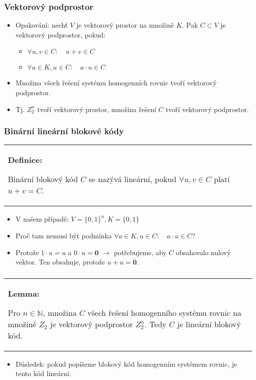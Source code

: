 \documentclass{beamer}
\newenvironment{definice}
{
    \begin{center}
    \begin{tabular}{p{9cm}}
    \textbf{Definice:}
}
{
    \end{tabular}
    \end{center}
}
\newenvironment{lema}
{
    \begin{center}
    \begin{tabular}{p{9cm}}
    \textbf{Lemma:}
}
{
    \end{tabular}
    \end{center}
}
\newenvironment{itemizex}%
  {\large \begin{itemize}%
    \setlength{\itemsep}{8pt}%
    \setlength{\parskip}{8pt}}%
  {\end{itemize}}
\begin{document}
\begin{frame}[t,fragile]\frametitle{Vektorový podprostor} 
    \begin{itemizex}
        \item Opakování: nechť $V$ je vektorový prostor na množině $K$. Pak $C\subset V$ je vektorový podprostor, pokud:
      \begin{itemizex}
        \item $\forall u,v \in C:\quad u+v\in C$
        \item $\forall a\in K, u \in C:\quad a\cdot u\in C$
      \end{itemizex}
      \item Množina všech řešení systému homogenních rovnic tvoří vektorový podprostor.
      \item Tj. $Z_2^n$ tvoří vektorový prostor, množina řešení $C$ tvoří vektorový podprostor.
    \end{itemizex}
\end{frame}



\begin{frame}[t,fragile]\frametitle{Binární lineární blokové kódy} 
    \begin{definice}
Binární blokový kód $C$ se nazývá lineární, pokud $\forall u,v\in C$ platí $u+v=C$.
    \end{definice}

    \begin{itemizex}
      
      \item V našem případě: $V=\{0,1\}^n, K=\{0,1\}$
      \item Proč tam nemusí být podmínka $\forall a\in K, u \in C:\quad a\cdot u\in C$?
      \item Protože $1\cdot u = u$ a $0\cdot u = \textbf{0}$ $\longrightarrow$ potřebujeme, aby $C$ obsahovalo nulový vektor. Ten obsahuje, protože $u+u=\textbf{0}$.
    \end{itemizex}
\end{frame}


\begin{frame}[t,fragile]\frametitle{} 
  \begin{lema}
    Pro $n\in\mathbb{N}$, množina $C$ všech řešení homogenního systému rovnic na množině $Z_2$ je vektorový podprostor $Z_2^n$. Tedy $C$ je lineární blokový kód.
  \end{lema}

  \begin{itemizex}
    \item Důsledek: pokud popíšeme blokový kód homogenním systémem rovnic, je tento kód lineární.
  \end{itemizex}
\end{frame}
\end{document}
